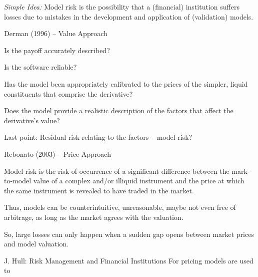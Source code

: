 


	{\it Simple Idea:} Model risk is the possibility that a (financial) institution suffers losses due to mistakes in the development and application of (validation) models.






{Derman (1996) -- Value Approach}






	Is the payoff accurately described?

	Is the software reliable?

	Has the model been appropriately calibrated to the prices of the simpler, liquid constituents that comprise the derivative?

	Does the model provide a realistic description of the factors that affect the derivative's value?






Last point: Residual risk relating to the factors -- model risk?

{Rebonato (2003) -- Price Approach}






	Model risk is the risk of occurrence of a significant difference between the mark-to-model value of a complex and/or illiquid instrument and the price at which the same instrument is revealed to have traded in the market.

	Thus, models can be counterintuitive, unreasonable, maybe not even free of arbitrage, as long as the market agrees with the valuation.

	So, large losses  can only happen when a sudden gap opens between market prices and model valuation.






{J. Hull: Risk Management and Financial Institutions}
For pricing models are used to






